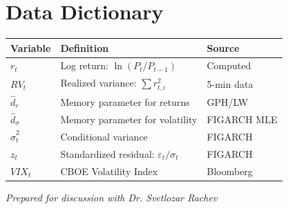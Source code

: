 \documentclass[11pt,a4paper]{article}
\theoremstyle{definition}
\newcommand{\dhat}{\hat{d}}
\newcommand{\sigmahat}{\hat{\sigma}}
\begin{document}
\section{Data Dictionary}

\begin{table}[htbp]
\centering
\begin{tabular}{@{}lll@{}}
\toprule
\textbf{Variable} & \textbf{Definition} & \textbf{Source} \\
\midrule
$r_t$ & Log return: $\ln(P_t/P_{t-1})$ & Computed \\
$RV_t$ & Realized variance: $\sum r^2_{t,i}$ & 5-min data \\
$\dhat_r$ & Memory parameter for returns & GPH/LW \\
$\dhat_\sigma$ & Memory parameter for volatility & FIGARCH MLE \\
$\sigmahat^2_t$ & Conditional variance & FIGARCH \\
$z_t$ & Standardized residual: $\varepsilon_t/\sigma_t$ & FIGARCH \\
$VIX_t$ & CBOE Volatility Index & Bloomberg \\
\bottomrule
\end{tabular}
\end{table}

\vfill
\begin{center}
\textit{Prepared for discussion with Dr. Svetlozar Rachev}
\end{center}
\end{document}
